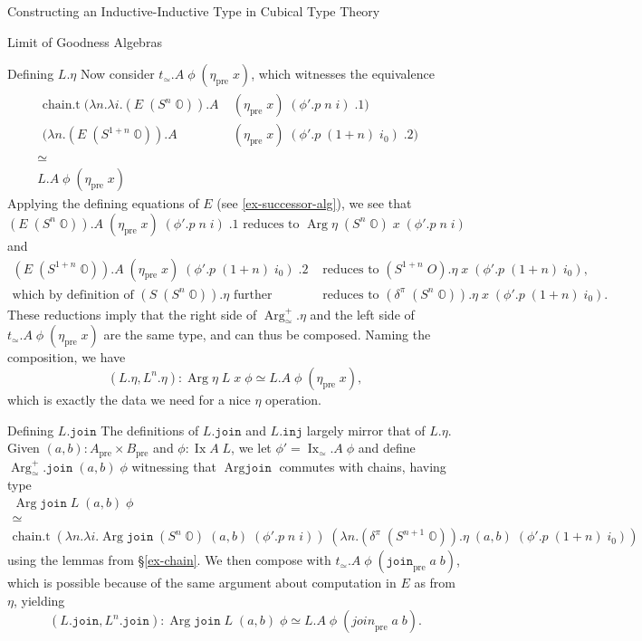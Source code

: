 \documentclass[runningheads]{llncs}
\DeclareMathOperator{\Arg}{Arg}
\DeclareMathOperator{\Ix}{Ix}
\newcommand{\pre}[1]{{#1}_\text{pre}}
\newcommand{\bbO}{\mathbb{O}}
\newcommand{\join}{\texttt{join}}
\newcommand{\inj}{\texttt{inj}}
\begin{document}
\begin{section}{Constructing an Inductive-Inductive Type in Cubical Type Theory}
\begin{subsection}{Limit of Goodness Algebras}
{\begin{subsubsection}{Defining $L.\eta$}
Now consider $t_\simeq.A\;\phi\;(\pre{\eta}\;x)$, which witnesses the equivalence
\begin{gather*}
\begin{align*}
\text{chain.t}\;(\lambda n.\lambda i.(E\;(S^n\;\bbO)).A&\;(\pre{\eta}\;x)\;(\phi'.p\;n\;i)\;.1)&\\(\lambda n.(E\;(S^{1+n}\;\bbO)).A&\;(\pre{\eta}\;x)\;(\phi'.p\;(1+n)\;i_0)\;.2)&
\end{align*}\\
\simeq\\
L.A\;\phi\;(\pre{\eta}\;x)
\end{gather*}
Applying the defining equations of $E$ (see \ref{ex-successor-alg}), we see that
\[(E\;(S^n\;\bbO)).A\;(\pre{\eta}\;x)\;(\phi'.p\;n\;i)\;.1\text{ reduces to } \Arg\eta\;(S^n\;\bbO)\;x\;(\phi'.p\;n\;i)\]
and
\begin{align*}
(E\;(S^{1+n}\;\bbO)).A\;(\pre{\eta}\;x)\;(\phi'.p\;(1+n)\;i_0)\;.2&\text{ reduces to } (S^{1+n}\;O).\eta\;x\;(\phi'.p\;(1+n)\;i_0),\\
\text{which by definition of $(S\;(S^n\;\bbO)).\eta$ further}&\text{ reduces to } (\delta^\pi\;(S^n\;\bbO)).\eta\;x\;(\phi'.p\;(1+n)\;i_0).
\end{align*}
These reductions imply that the right side of $\Arg_\simeq^+.\eta$ and the left side of $t_\simeq.A\;\phi\;(\pre{\eta}\;x)$ are the same type, and can thus be composed. Naming the composition, we have \[(L.\eta, L^n.\eta) : \Arg\eta\;L\;x\;\phi \simeq L.A\;\phi\;(\pre{\eta}\;x),\] which is exactly the data we need for a nice $\eta$ operation.
\end{subsubsection}

\begin{subsubsection}{Defining $L.\join$}
The definitions of $L.\join$ and $L.\inj$ largely mirror that of $L.\eta$.
Given $(a, b) : \pre{A} \times \pre{B}$ and $\phi : \Ix A\;L$, we let $\phi' = \Ix_\simeq.A\;\phi$ and define $\Arg_\simeq^+.\join\;(a,b)\;\phi$ witnessing that $\Arg\join$ commutes with chains, having type
\begin{gather*}
\Arg\join\;L\;(a,b)\;\phi\\
\simeq\\
\text{chain.t}\;(\lambda n.\lambda i.\Arg\join\;(S^n\;\bbO)\;(a,b)\;(\phi'.p\;n\;i))\;(\lambda n.(\delta^\pi\;(S^{n+1}\;\bbO)).\eta\;(a,b)\;(\phi'.p\;(1+n)\;i_0))
\end{gather*}
using the lemmas from \S\ref{ex-chain}. We then compose with $t_\simeq.A\;\phi\;(\pre{\join}\;a\;b)$, which is possible because of the same argument about computation in $E$ as from $\eta$, yielding \[(L.\join, L^n.\join) : \Arg\join\;L\;(a,b)\;\phi \simeq L.A\;\phi\;(\pre{join}\;a\;b).\]
\end{subsubsection}

}
\end{subsection}
\end{section}
\end{document}
